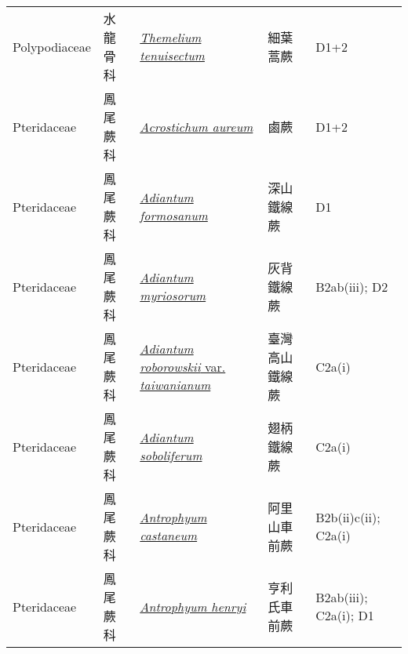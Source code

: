 {\begin{longtable}{L{2.5cm}L{2cm}L{5cm}L{2.5cm}L{3cm}}
    Polypodiaceae & 水龍骨科 & \href{http://www.theplantlist.org/tpl1.1/search?q=Themelium+tenuisectum}{\textit{Themelium tenuisectum} } & 細葉蒿蕨 & D1+2    \\
    Pteridaceae & 鳳尾蕨科 & \href{http://www.theplantlist.org/tpl1.1/search?q=Acrostichum+aureum}{\textit{Acrostichum aureum} } & 鹵蕨 & D1+2    \\
    Pteridaceae & 鳳尾蕨科 & \href{http://www.theplantlist.org/tpl1.1/search?q=Adiantum+formosanum}{\textit{Adiantum formosanum} } & 深山鐵線蕨 & D1    \\
    Pteridaceae & 鳳尾蕨科 & \href{http://www.theplantlist.org/tpl1.1/search?q=Adiantum+myriosorum}{\textit{Adiantum myriosorum} } & 灰背鐵線蕨 & B2ab(iii); D2    \\
    Pteridaceae & 鳳尾蕨科 & \href{http://www.theplantlist.org/tpl1.1/search?q=Adiantum+roborowskii+var.+taiwanianum}{\textit{Adiantum roborowskii} var. \textit{taiwanianum} } & 臺灣高山鐵線蕨 & C2a(i)    \\
    Pteridaceae & 鳳尾蕨科 & \href{http://www.theplantlist.org/tpl1.1/search?q=Adiantum+soboliferum}{\textit{Adiantum soboliferum} } & 翅柄鐵線蕨 & C2a(i)    \\
    Pteridaceae & 鳳尾蕨科 & \href{http://www.theplantlist.org/tpl1.1/search?q=Antrophyum+castaneum}{\textit{Antrophyum castaneum} } & 阿里山車前蕨 & B2b(ii)c(ii); C2a(i)    \\
    Pteridaceae & 鳳尾蕨科 & \href{http://www.theplantlist.org/tpl1.1/search?q=Antrophyum+henryi}{\textit{Antrophyum henryi} } & 亨利氏車前蕨 & B2ab(iii); C2a(i); D1    \\

\end{longtable}}
